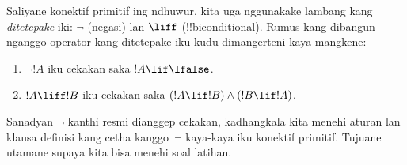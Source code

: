 \documentclass[../../../include/open-logic-section]{subfiles}
\begin{document}
Saliyane konektif primitif ing ndhuwur, kita uga nggunakake lambang
kang \emph{ditetepake} iki: $\lnot$ (negasi) lan $\liff$
(!!{biconditional}). Rumus kang dibangun nganggo operator kang
ditetepake iku kudu dimangerteni kaya mangkene:
\begin{enumerate}
\item $\lnot !A$ iku cekakan saka $!A \lif \lfalse$.

\item $!A \liff !B$ iku cekakan saka $(!A \lif !B) \land (!B
  \lif !A)$.
\end{enumerate}

Sanadyan $\lnot$ kanthi resmi dianggep cekakan, kadhangkala kita
menehi aturan lan klausa definisi kang cetha kanggo~$\lnot$
kaya-kaya iku konektif primitif. Tujuane utamane supaya kita bisa
menehi soal latihan.
\end{document}
